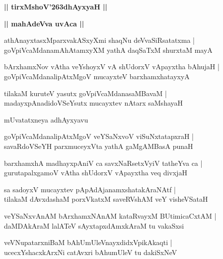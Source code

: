 \documentclass[twoside,12pt,openright]{book}
\def\S{\char'263}
\newcounter{shloka}[chapter]
\def\uvaca#1{\centerline{{\large\textbf{#1}}}}
\begin{document}
\begin{center}
{\LARGE\bfseries || tirxMshoV\S dhAyxyaH ||}
\end{center}

\uvaca{|| mahAdeVva uvAca ||}

\begin{shloka}%
athAnayxtasxMparxvakASxyXmi shaqNu deVvaSiRsatatxma |\\
goVpiVcaMdanamAhAtamxyXM yathA daqSaTxM shurxtaM mayA 
\end{shloka}

\begin{shloka}%
bArxhamxNov vAtha veYshoyxV vA shUdorxV vApayxtha bAhujaH |\\
goVpiVcaMdanalipAtxMgoV mucayxteV barxhamxhatayxyA 
\end{shloka}

\begin{shloka}%
tilakaM kuruteV yasutx goVpiVcaMdanasaMBavaM |\\
madayxpAnadidoVSeYsutx mucayxtev nAtarx saMshayaH
\end{shloka}

\begin{center}
mUvatatxneya adhAyxyavu
\end{center}

\begin{shloka}%
goVpiVcaMdanalipAtxMgoV veYSaNxvoV viSuNxtatapxraH |\\
savaRdoVSeYH parxmuceyxVta yathA gaMgAMBasA punaH 
\end{shloka}

\begin{shloka}%
barxhamxhA madhayxpAniV ca savxNaRsetxVyiV tatheYva ca |\\
gurutapalxgamoV vAtha shUdorxV vApayxtha veq divxjaH 
\end{shloka}

\begin{shloka}%
sa sadoyxV mucayxtev pApAdAjanamxshatakAraNAtf |\\
tilakaM dAvxdashaM porxVkatxM saveRVshAM veY visheVSataH
\end{shloka}

\begin{shloka}%
veYSaNxvAnAM bArxhamxNAnAM kataRvayxM BUtimicaCxtAM |\\
daMDAkAraM lalATeV sAyxtapxdAmxkAraM tu vakaSxsi
\end{shloka}

\begin{shloka}%
veVNupatarxniBaM bAhUmUleVnayxdidxVpikAkaqti |\\
ucecxYshacxkArxNi catAvxri bAhumUleV tu dakiSxNeV 
\end{shloka}
\end{document}
